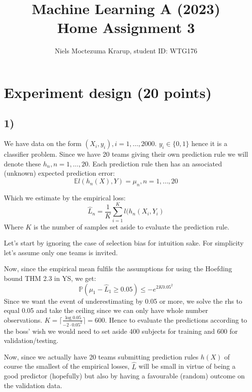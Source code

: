 \documentclass[a4paper,12pt]{article}
\begin{document}
\title{Machine Learning A (2023)\\Home Assignment 3}
\author{\color{red}Niels Moctezuma Krarup, student ID: WTG176}
\date{}
\maketitle

\tableofcontents %
\newpage %

\section{Experiment design (20 points)}
\subsection*{1)}
We have data on the form $(X_i, y_i), i = 1,\dots,2000$. $y_i \in \{0,1\}$ hence it is a classifier problem. Since we have 20 teams giving their own prediction rule we will denote these $h_n, n = 1,\dots,20$.
Each prediction rule then has an associated (unknown) expected prediction error:
$$
\mathbb{E}l(h_n(X), Y) = \mu_n, n = 1,\dots,20
$$

Which we estimate by the empirical loss:
$$
\hat{L}_n = \frac{1}{K}\sum_{i = 1}^Kl(h_n(X_i, Y_i) 
$$
Where $K$ is the number of samples set aside to evaluate the prediction rule.


Let's start by ignoring the case of selection bias for intuition sake. For simplicity let's assume only one teams is invited.

Now, since the empirical mean fulfils the assumptions for using the Hoefding bound THM 2.3 in YS, we get:
$$
\mathbb{P}(\mu_1 - \hat{L}_1 \geq 0.05) \leq -e^{2K0.05^2} 
$$
Since we want the event of underestimating by 0.05 or more, we solve the rhs to equal 0.05 and take the ceiling since we can only have whole number observations. $K =\lceil \frac{\log0.05}{-2\cdot 0.05^2} \rceil= 600$. Hence to evaluate the predictions according to the boss' wish we would need to set aside 400 subjects for training and 600 for validation/testing.

Now, since we actually have 20 teams submitting prediction rules $h(X)$ of course the smallest of the empirical losses, $\hat{L}$ will be small in virtue of being a good predictor (hopefully) but also by having a favourable (random) outcome on the validation data. 
\end{document}
